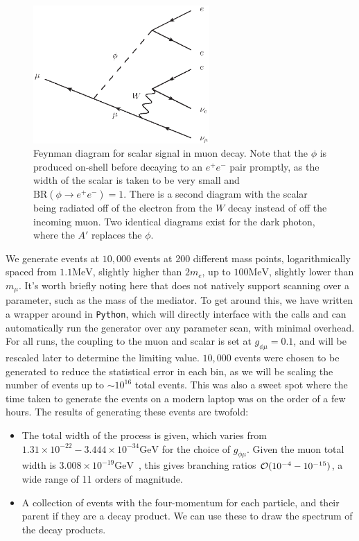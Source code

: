 \begin{figure}[h]
    \centering
    \includegraphics[width=0.6\textwidth]{Figures/feynman_diagrams/mu_eeenunu_scalar}
    \caption{Feynman diagram for scalar signal in muon decay. Note that the $\phi$ is produced on-shell before decaying to an $e^+ e^-$ pair promptly, as the width of the scalar is taken to be very small and $\textrm{BR}(\phi \rightarrow e^+ e^-) = 1$. There is a second diagram with the scalar being radiated off of the electron from the $W$ decay instead of off the incoming muon. Two identical diagrams exist for the dark photon, where the $A'$ replaces the $\phi$.}
    \label{fig:mu_eeenunu_scalar}
\end{figure}

We generate events at $10,000$ events at 200 different mass points, logarithmically spaced from $1.1\textrm{MeV}$, slightly higher than $2m_e$, up to $100\textrm{MeV}$, slightly lower than $m_\mu$.
It's worth briefly noting here that \madgraph does not natively support scanning over a parameter, such as the mass of the mediator.
To get around this, we have written a wrapper around \madgraph in \texttt{Python}, which will directly interface with the \madgraph calls and can automatically run the generator over any parameter scan, with minimal overhead.
For all runs, the coupling to the muon and scalar is set at $g_{\phi\mu} = 0.1$, and will be rescaled later to determine the limiting value.
$10,000$ events were chosen to be generated to reduce the statistical error in each bin, as we will be scaling the number of events up to $\sim 10^{16}$ total events.
This was also a sweet spot where the time taken to generate the events on a modern laptop was on the order of a few hours.
The results of generating these events are twofold:
\begin{itemize}
    \item{The total width of the process is given, which varies from $1.31\times 10^{-22} - 3.444\times 10^{-34}\textrm{GeV}$ for the choice of $g_{\phi\mu}$. Given the muon total width is $3.008 \times 10^{-19}\textrm{GeV}$~\cite{Agashe:2014kda}, this gives branching ratios $\operatorname{\mathcal{O}}(10^{-4} - 10^{-15})$, a wide range of 11 orders of magnitude.}
    \item{A collection of events with the four-momentum for each particle, and their parent if they are a decay product. We can use these to draw the spectrum of the decay products.}
\end{itemize}

